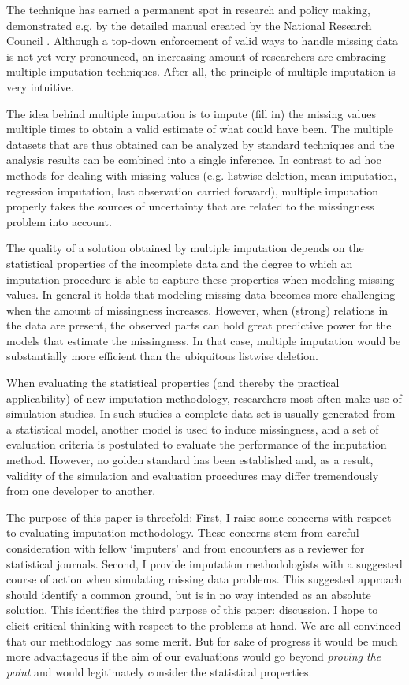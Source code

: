 \documentclass[12pt, a4paper]{article}
\begin{document}
The technique has earned a permanent spot in research and policy making, demonstrated e.g. by the detailed manual created by the National Research Council \citep*{little2012prevention}. Although a top-down enforcement of valid ways to handle missing data is not yet very pronounced, an increasing amount of researchers are embracing multiple imputation techniques. After all, the principle of multiple imputation is very intuitive.

The idea behind multiple imputation is to impute (fill in) the missing values multiple times to obtain a valid estimate of what could have been. The multiple datasets that are thus obtained can be analyzed by standard techniques and the analysis results can be combined into a single inference. In contrast to ad hoc methods for dealing with missing values (e.g. listwise deletion, mean imputation, regression imputation, last observation carried forward), multiple imputation properly takes the sources of uncertainty that are related to the missingness problem into account.

The quality of a solution obtained by multiple imputation depends on the statistical properties of the incomplete data and the degree to which an imputation procedure is able to capture these properties when modeling missing values. In general it holds that modeling missing data becomes more challenging when the amount of missingness increases. However, when (strong) relations in the data are present, the observed parts can hold great predictive power for the models that estimate the missingness. In that case, multiple imputation would be substantially more efficient than the ubiquitous listwise deletion.

When evaluating the statistical properties (and thereby the practical applicability) of new imputation methodology, researchers most often make use of simulation studies. In such studies a complete data set is usually generated from a statistical model, another model is used to induce missingness, and a set of evaluation criteria is postulated to evaluate the performance of the imputation method. However, no golden standard has been established and, as a result, validity of the simulation and evaluation procedures may differ tremendously from one developer to another. 

The purpose of this paper is threefold: First, I raise some concerns with respect to evaluating imputation methodology. These concerns stem from careful consideration with fellow `imputers' and from encounters as a reviewer for statistical journals. Second, I provide imputation methodologists with a suggested course of action when simulating missing data problems. This suggested approach should identify a common ground, but is in no way intended as an absolute solution. This identifies the third purpose of this paper: discussion. I hope to elicit critical thinking with respect to the problems at hand. We are all convinced that our methodology has some merit. But for sake of progress it would be much more advantageous if the aim of our evaluations would go beyond \emph{proving the point} and would legitimately consider the statistical properties. 
\end{document}
